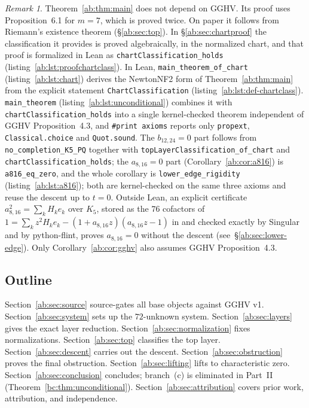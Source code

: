 \documentclass[a4paper,11pt]{article}
\newcommand{\filename}[1]{\texttt{\seqsplit{#1}}}
\theoremstyle{plain}
\theoremstyle{definition}
\theoremstyle{remark}
\newtheorem{remark}[theorem]{Remark}
\begin{document}
\begin{remark}\label{ab:rem:conditional}
Theorem~\ref{ab:thm:main} does not depend on GGHV. Its proof uses Proposition~6.1 for $m=7$,
which is proved twice. On paper it follows from Riemann's existence theorem
(\S\ref{ab:sec:top}). In \S\ref{ab:sec:chartproof} the classification it provides is proved
algebraically, in the normalized chart, and that proof is formalized in Lean as
\texttt{chartClassification\_holds} (listing~\ref{ab:lst:proofchartclass}).
In Lean, \texttt{main\_theorem\_of\_chart} (listing~\ref{ab:lst:chart}) derives the NewtonNF2 form of
Theorem~\ref{ab:thm:main} from the explicit statement \texttt{ChartClassification}
(listing~\ref{ab:lst:def-chartclass}). \texttt{main\_theorem} (listing~\ref{ab:lst:unconditional})
combines it with \texttt{chartClassification\_holds} into a single kernel-checked
theorem independent of GGHV Proposition~4.3, and \texttt{\#print axioms} reports only \texttt{propext}, \texttt{Classical.choice}
and \texttt{Quot.sound}.
The $b_{12,24}=0$ part follows from \texttt{no\_completion\_K5\_PQ} together with \texttt{topLayerClassification\_of\_chart} and \texttt{chartClassification\_holds}; the $a_{8,16}=0$ part (Corollary~\ref{ab:cor:a816}) is \texttt{a816\_eq\_zero}, and the whole corollary is \texttt{lower\_edge\_rigidity} (listing~\ref{ab:lst:a816}); both are kernel-checked on the same three axioms and reuse the descent up to $t=0$. Outside Lean, an explicit certificate $a_{8,16}^2=\sum_k H_k e_k$ over $K_5$, stored as the $76$ cofactors of $1=\sum_k z^2H_k e_k-(1+a_{8,16}z)(a_{8,16}z-1)$ in \filename{scripts/a816\_certificate/a816\_lift.txt} and checked exactly by {\sc Singular} and by python-flint, proves $a_{8,16}=0$ without the descent (see~\S\ref{ab:sec:lower-edge}). Only Corollary~\ref{ab:cor:gghv} also assumes GGHV
Proposition~4.3.
\end{remark}

\subsection{Outline}

Section~\ref{ab:sec:source} source-gates all base objects against GGHV v1. Section~\ref{ab:sec:system} sets up the $72$-unknown system. Section~\ref{ab:sec:layers} gives the exact layer reduction. Section~\ref{ab:sec:normalization} fixes normalizations. Section~\ref{ab:sec:top} classifies the top layer. Section~\ref{ab:sec:descent} carries out the descent. Section~\ref{ab:sec:obstruction} proves the final obstruction. Section~\ref{ab:sec:lifting} lifts to characteristic zero. Section~\ref{ab:sec:conclusion} concludes; branch~(c) is eliminated in Part~II (Theorem~\ref{bc:thm:unconditional}). Section~\ref{ab:sec:attribution} covers prior work, attribution, and independence.
\end{document}
